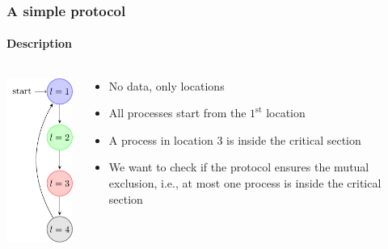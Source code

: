 \begin{frame}
  \frametitle{A simple protocol}
  \framesubtitle{Description}

  \begin{columns}
  \begin{column}{0.3\textwidth}
    \centering
    \includegraphics{pictures/demo-prot1-fig}
  \end{column}

  \begin{column}{0.7\textwidth}
    \begin{itemize}
      \item No data, only locations

      \item All processes start from the $1^{\text{st}}$ location

      \item A process in location $3$ is inside the critical section

      \item We want to check if the protocol ensures the mutual exclusion,
	    i.e., at most one process is inside the critical section

    \end{itemize}
  \end{column}

  \end{columns}  

\end{frame}

